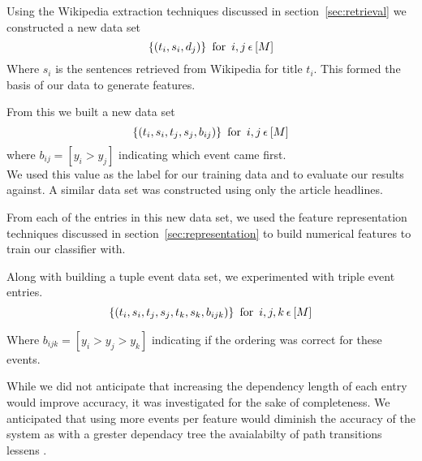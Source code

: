 \documentclass[bsc,frontabs,twoside,singlespacing,parskip,deptreport]{infthesis}     %
\begin{document}
    Using the Wikipedia extraction techniques discussed in section~\ref{sec:retrieval} we constructed a new data set
    \begin{equation}
      \{(t_{i},s_{i},d_{j})\} \hspace{0.5em} \text{for} \hspace{0.5em}i,j  \hspace{0.2em}\epsilon \hspace{0.2em}[M]\nonumber
    \end{equation}
    Where $s_i$ is the sentences retrieved from Wikipedia for title $t_i$. 
    This formed the basis of our data to generate features.

    From this we built a new data set
    \begin{equation}
      \{(t_{i},s_{i},t_{j},s_{j},b_{ij})\} \hspace{0.5em} \text{for} \hspace{0.5em} i,j \hspace{0.2em}\epsilon \hspace{0.2em}[M]\nonumber
    \end{equation}
    where $b_{ij} = [y_{i} > y_{j}]$ indicating which event came first.\\
    We used this value as the label for our training data and to evaluate our results against.
    A similar data set was constructed using only the article headlines.
    
    From each of the entries in this new data set, we used the feature representation techniques discussed in section~\ref{sec:representation} to build numerical
    features to train our classifier with.

Along with building a tuple event data set, we experimented with triple event entries.
\begin{equation}
      \{(t_{i},s_{i},t_{j},s_{j},t_{k},s_{k},b_{ijk})\} \hspace{0.5em} \text{for} \hspace{0.5em} i,j,k \hspace{0.2em}\epsilon \hspace{0.2em}[M]\nonumber
\end{equation}

Where $b_{ijk} = [y_i > y_j > y_k]$ indicating if the ordering was correct for these events.

While we did not anticipate that increasing the dependency length of each entry would improve accuracy, it was investigated
for the sake of completeness. We anticipated that using more events per feature would diminish the accuracy of the system as
with a grester dependacy tree the avaialabilty of path transitions lessens \cite{gerdes2013computational}.
\end{document}
